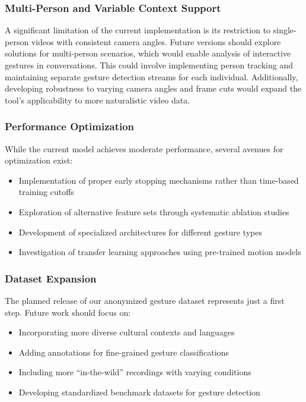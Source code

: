 \subsubsection{Multi-Person and Variable Context Support}
A significant limitation of the current implementation is its restriction to single-person videos with consistent camera angles. Future versions should explore solutions for multi-person scenarios, which would enable analysis of interactive gestures in conversations. This could involve implementing person tracking and maintaining separate gesture detection streams for each individual. Additionally, developing robustness to varying camera angles and frame cuts would expand the tool's applicability to more naturalistic video data.

\subsubsection{Performance Optimization}
While the current model achieves moderate performance, several avenues for optimization exist:
\begin{itemize}
    \item Implementation of proper early stopping mechanisms rather than time-based training cutoffs
    \item Exploration of alternative feature sets through systematic ablation studies
    \item Development of specialized architectures for different gesture types
    \item Investigation of transfer learning approaches using pre-trained motion models
\end{itemize}

\subsubsection{Dataset Expansion}
The planned release of our anonymized gesture dataset represents just a first step. Future work should focus on:
\begin{itemize}
    \item Incorporating more diverse cultural contexts and languages
    \item Adding annotations for fine-grained gesture classifications
    \item Including more ``in-the-wild'' recordings with varying conditions
    \item Developing standardized benchmark datasets for gesture detection
\end{itemize}

